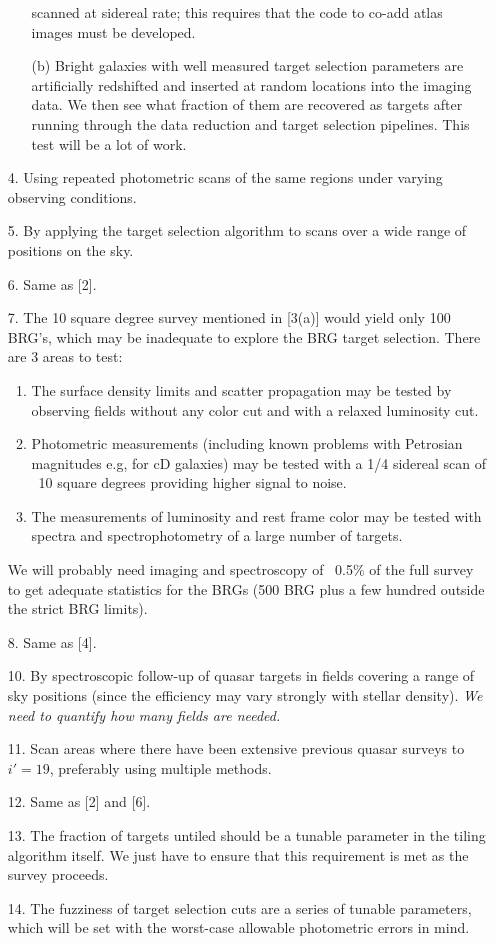\begin{enumerate}
\begin{enumerate}
scanned at sidereal rate; this requires that the code to co-add atlas
images must be developed. 
\item[(b)] Bright galaxies with well measured target selection parameters
are artificially redshifted and inserted at random locations into the
imaging data.  We then see what fraction of them are recovered as targets
after running through the data reduction and target selection pipelines.
This test will be a lot of work.
\end{enumerate}
\item[4.] Using repeated photometric scans of the same regions under
varying observing conditions.  
\item[5.] By applying the target selection algorithm to scans over
a wide range of positions on the sky.
\item[6.] Same as [2].  
\item[7.] The 10 square degree survey mentioned in [3(a)] would yield
only 100 BRG's, which may be inadequate to explore the BRG target
selection.  
 There are 3 areas to test:
\begin{enumerate} 
\item	The surface density limits and scatter propagation may be
	tested by observing fields without any color cut and with
	a relaxed luminosity cut.
\item Photometric measurements (including known problems with Petrosian
	magnitudes e.g, for cD galaxies) may be tested with a 1/4 sidereal
	scan of ~10 square degrees providing higher signal to noise.
\item The measurements of luminosity and rest frame color may be
	tested with spectra and spectrophotometry of a large number of
targets.
\end{enumerate}
We will probably need imaging and spectroscopy of ~0.5\% of the full
survey to get adequate statistics for the BRGs (500 BRG plus a few hundred
outside the strict BRG limits).
\item[8.] Same as [4].
\item[10.] By spectroscopic follow-up of quasar targets in fields covering
a range of sky positions (since the efficiency may vary strongly
with stellar density). {\it We need to quantify how many fields are needed.}
\item[11.] Scan areas where there have been extensive previous quasar
surveys to $i' = 19$, preferably using multiple methods. 
\item[12.] Same as [2] and [6].
\item[13.] The fraction of targets untiled should be a tunable parameter
in the tiling algorithm itself.  We just have to ensure that this
requirement is met as the survey proceeds.
\item[14.] The fuzziness of target selection cuts are a series of
tunable parameters, which will be set with the worst-case allowable
photometric errors in mind. 
\end{enumerate}


